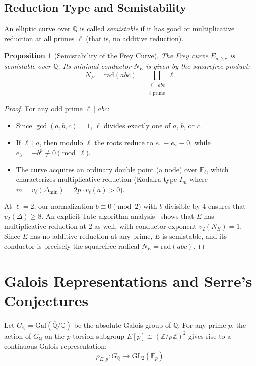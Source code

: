 \documentclass[11pt,a4paper]{article}
\theoremstyle{plain}
\newtheorem{proposition}[theorem]{Proposition}
\theoremstyle{definition}
\theoremstyle{remark}
\newcommand{\Q}{\mathbb{Q}}
\newcommand{\Z}{\mathbb{Z}}
\newcommand{\F}{\mathbb{F}}
\newcommand{\GL}{\mathrm{GL}}
\newcommand{\Gal}{\mathrm{Gal}}
\begin{document}
\subsection{Reduction Type and Semistability}
An elliptic curve over $\Q$ is called \emph{semistable} if it has good or multiplicative reduction at all primes $\ell$ (that is, no additive reduction).

\begin{proposition}[Semistability of the Frey Curve]
The Frey curve $E_{a,b,c}$ is semistable over $\Q$. Its minimal conductor $N_E$ is given by the squarefree product:
\begin{equation}
N_E = \mathrm{rad}(abc) = \prod_{\substack{\ell \mid abc \\ \ell \text{ prime}}} \ell.
\end{equation}
\end{proposition}
\begin{proof}
For any odd prime $\ell \mid abc$:
\begin{itemize}
    \item Since $\gcd(a, b, c) = 1$, $\ell$ divides exactly one of $a$, $b$, or $c$.
    \item If $\ell \mid a$, then modulo $\ell$ the roots reduce to $e_1 \equiv e_2 \equiv 0$, while $e_3 = -b^p \not\equiv 0 \pmod \ell$.
    \item The curve acquires an ordinary double point (a node) over $\F_\ell$, which characterizes multiplicative reduction (Kodaira type $I_m$ where $m = v_\ell(\Delta_{\min}) = 2p \cdot v_\ell(a) > 0$).
\end{itemize}
At $\ell = 2$, our normalization $b \equiv 0 \pmod 2$ with $b$ divisible by $4$ ensures that $v_2(\Delta) \ge 8$. An explicit Tate algorithm analysis~\cite{silverman2009} shows that $E$ has multiplicative reduction at $2$ as well, with conductor exponent $v_2(N_E) = 1$. Since $E$ has no additive reduction at any prime, $E$ is semistable, and its conductor is precisely the squarefree radical $N_E = \mathrm{rad}(abc)$.
\end{proof}

\section{Galois Representations and Serre's Conjectures}

Let $G_\Q = \Gal(\overline{\Q}/\Q)$ be the absolute Galois group of $\Q$. For any prime $p$, the action of $G_\Q$ on the $p$-torsion subgroup $E[p] \cong (\Z/p\Z)^2$ gives rise to a continuous Galois representation:
\begin{equation}
\bar{\rho}_{E,p}: G_\Q \longrightarrow \GL_2(\F_p).
\end{equation}
\end{document}
